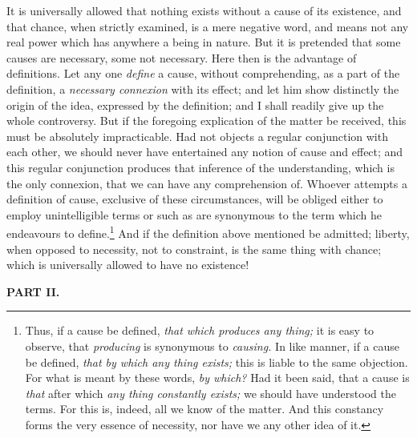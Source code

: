 \documentclass[]{article}
\newcounter{authornote}[page]
\newcommand*{\authornote}[1]{\renewcommand{\thefootnote}{\fnsymbol{footnote}}\stepcounter{authornote}\footnote[\value{authornote}]{#1}\renewcommand{\thefootnote}{\arabic{footnote}}}
\newcommand*{\itemsubsection}[1]{\begin{center}\addcontentsline{toc}{subsection}{#1}\textbf{#1}\end{center}}
\begin{document}
\begin{sectionbody}
\humeparagraph  It is universally allowed that nothing exists without a cause of its existence, and that chance, when strictly examined, is a mere negative word, and means not any real power which has anywhere a being in nature. But it is pretended that some causes are necessary, some not necessary. Here then is the advantage of definitions. Let any one \emph{define} a cause, without comprehending, as a part of the definition, a \emph{necessary connexion} with its effect; and let him show distinctly the origin of the idea, expressed by the definition; and I shall readily give up the whole controversy. But if the foregoing explication of the matter be received, this must be absolutely impracticable. Had not objects a regular conjunction with each other, we should never have entertained any notion of cause and effect; and this regular conjunction produces that inference of the understanding, which is the only connexion, that we can have any comprehension of. Whoever attempts a definition of cause, exclusive of these circumstances, will be obliged either to employ unintelligible terms or such as are synonymous to the term which he endeavours to define.\authornote{Thus, if a cause be defined, \emph{that which produces any thing;} it is easy to observe, that \emph{producing} is synonymous to \emph{causing.} In like manner, if a cause be defined, \emph{that by which any thing exists;} this is liable to the same objection. For what is meant by these words, \emph{by which?} Had it been said, that a cause is \emph{that} after which \emph{any thing constantly exists;}  we should have understood the terms. For this is, indeed, all we know of the matter. And this constancy forms the very essence of necessity, nor have we any other idea of it.} And if the definition above mentioned be admitted; liberty, when opposed to necessity, not to constraint, is the same thing with chance; which is universally allowed to have no existence!

\end{sectionbody}

\itemsubsection{PART II.}
\end{document}

